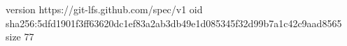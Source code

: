 version https://git-lfs.github.com/spec/v1
oid sha256:5dfd1901f3ff63620dc1ef83a2ab3db49e1d085345f32d99b7a1c42c9aad8565
size 77
